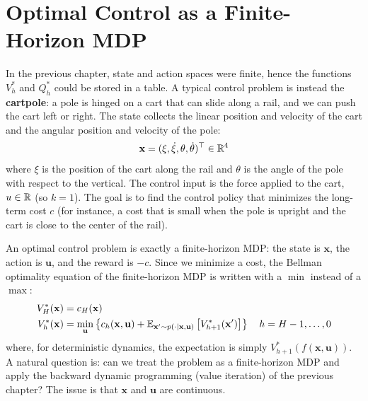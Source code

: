 \documentclass[10pt, a4paper]{report}
\begin{document}
\section{Optimal Control as a Finite-Horizon MDP}
In the previous chapter, state and action spaces were finite, hence the functions $V_h^*$ and $Q_h^*$ could be stored in a table. A typical control problem is instead the \textbf{cartpole}: a pole is hinged on a cart that can slide along a rail, and we can push the cart left or right. The state collects the linear position and velocity of the cart and the angular position and velocity of the pole:\begin{equation}
    \mathbf x=(\xi,\dot\xi,\theta,\dot\theta)^\top\in{\mathbb R}^4
\end{equation}
where $\xi$ is the position of the cart along the rail and $\theta$ is the angle of the pole with respect to the vertical. The control input is the force applied to the cart, $u\in{\mathbb R}$ (so $k=1$). The goal is to find the control policy that minimizes the long-term cost $c$ (for instance, a cost that is small when the pole is upright and the cart is close to the center of the rail).

An optimal control problem is exactly a finite-horizon MDP: the state is $\mathbf x$, the action is $\mathbf u$, and the reward is $-c$. Since we minimize a cost, the Bellman optimality equation of the finite-horizon MDP is written with a $\min$ instead of a $\max$:\begin{align}
    V_H^*(\mathbf x)&=c_H(\mathbf x)\\
    V_h^*(\mathbf x)&=\min_{\mathbf u}\left\{c_h(\mathbf x,\mathbf u)+{\mathbb E}_{\mathbf x'\sim p(\cdot\mid\mathbf x,\mathbf u)}\left[V_{h+1}^*(\mathbf x')\right]\right\}\quad h=H-1,\dots,0
\end{align}
where, for deterministic dynamics, the expectation is simply $V_{h+1}^*(f(\mathbf x,\mathbf u))$. A natural question is: can we treat the problem as a finite-horizon MDP and apply the backward dynamic programming (value iteration) of the previous chapter? The issue is that $\mathbf x$ and $\mathbf u$ are continuous.
\end{document}
